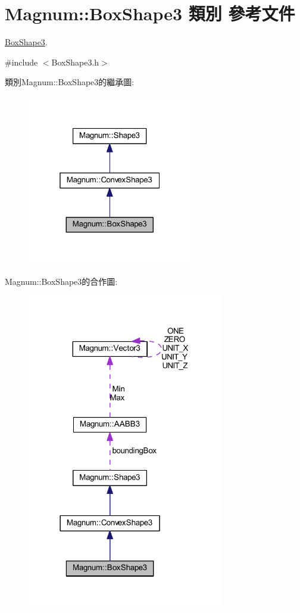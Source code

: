 \hypertarget{class_magnum_1_1_box_shape3}{}\section{Magnum\+:\+:Box\+Shape3 類別 參考文件}
\label{class_magnum_1_1_box_shape3}


\hyperlink{class_magnum_1_1_box_shape3}{Box\+Shape3}.  




{\ttfamily \#include $<$Box\+Shape3.\+h$>$}



類別\+Magnum\+:\+:Box\+Shape3的繼承圖\+:\nopagebreak
\begin{figure}[H]
\begin{center}
\leavevmode
\includegraphics[width=205pt]{class_magnum_1_1_box_shape3__inherit__graph}
\end{center}
\end{figure}


Magnum\+:\+:Box\+Shape3的合作圖\+:\nopagebreak
\begin{figure}[H]
\begin{center}
\leavevmode
\includegraphics[width=242pt]{class_magnum_1_1_box_shape3__coll__graph}
\end{center}
\end{figure}
